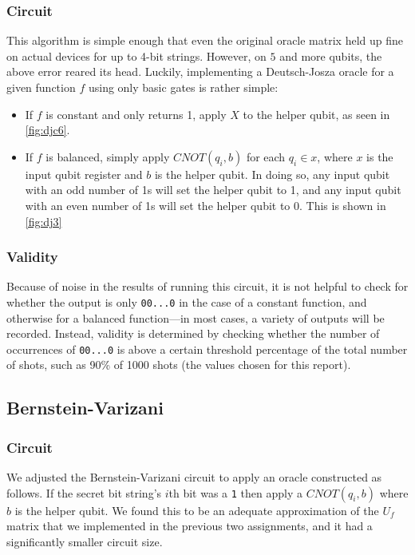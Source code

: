 \documentclass[12pt]{article}
\begin{document}
\subsubsection*{Circuit}
This algorithm is simple enough that even the original oracle matrix held up fine on actual devices for up to 4-bit strings.
However, on $5$ and more qubits, the above error reared its head.
Luckily, implementing a Deutsch-Josza oracle for a given function $f$ using only basic gates is rather simple:
\begin{itemize}
    \item If $f$ is constant and only returns 1, apply $X$ to the helper qubit, as seen in \autoref{fig:djc6}.
    \item If $f$ is balanced, simply apply $CNOT(q_i, b)$ for each $q_i \in x$, where $x$ is the input qubit register and $b$ is the helper qubit.
        In doing so, any input qubit with an odd number of 1s will set the helper qubit to 1, and any input qubit with an even number of 1s will set the helper qubit to 0.
        This is shown in \autoref{fig:dj3}
\end{itemize}

\subsubsection*{Validity}
Because of noise in the results of running this circuit, it is not helpful to check for whether the output is only \texttt{00...0} in the case of a constant function, and otherwise for a balanced function---in most cases, a variety of outputs will be recorded.
Instead, validity is determined by checking whether the number of occurrences of \texttt{00...0} is above a certain threshold percentage of the total number of shots, such as 90\% of 1000 shots (the values chosen for this report).

\subsection{Bernstein-Varizani}

\subsubsection*{Circuit}
We adjusted the Bernstein-Varizani circuit to apply an oracle constructed as follows.
If the secret bit string’s $i$th bit was a \texttt{1} then apply a $CNOT(q_i, b)$ where $b$ is the helper qubit.
We found this to be an adequate approximation of the $U_f$ matrix that we implemented in the previous two assignments, and it had a significantly smaller circuit size.
\end{document}
